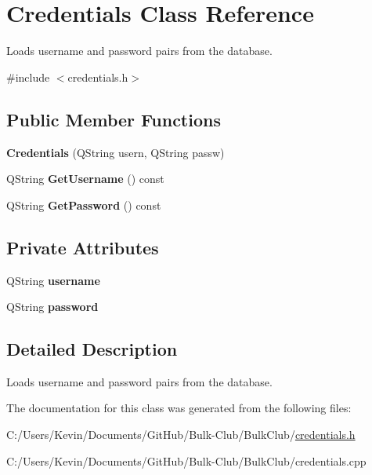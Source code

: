 \hypertarget{class_credentials}{}\section{Credentials Class Reference}
\label{class_credentials}


Loads username and password pairs from the database.  




{\ttfamily \#include $<$credentials.\+h$>$}

\subsection*{Public Member Functions}
\begin{DoxyCompactItemize}
\item 
\mbox{\label{class_credentials_a20ef865fe7e0c03ccafc644bfa7e5299}} 
{\bfseries Credentials} (Q\+String usern, Q\+String passw)
\item 
\mbox{\label{class_credentials_aef9c82c68cc3bd74ba9db91a1f21c19d}} 
Q\+String {\bfseries Get\+Username} () const
\item 
\mbox{\label{class_credentials_a5e736c8291c090474d8939f54ab34674}} 
Q\+String {\bfseries Get\+Password} () const
\end{DoxyCompactItemize}
\subsection*{Private Attributes}
\begin{DoxyCompactItemize}
\item 
\mbox{\label{class_credentials_a1e875612ba94a6853ffc948d9aa3ccfc}} 
Q\+String {\bfseries username}
\item 
\mbox{\label{class_credentials_a6d871a6473fb4101d9b60306dd56603e}} 
Q\+String {\bfseries password}
\end{DoxyCompactItemize}


\subsection{Detailed Description}
Loads username and password pairs from the database. 

The documentation for this class was generated from the following files\+:\begin{DoxyCompactItemize}
\item 
C\+:/\+Users/\+Kevin/\+Documents/\+Git\+Hub/\+Bulk-\/\+Club/\+Bulk\+Club/\mbox{\hyperlink{credentials_8h}{credentials.\+h}}\item 
C\+:/\+Users/\+Kevin/\+Documents/\+Git\+Hub/\+Bulk-\/\+Club/\+Bulk\+Club/credentials.\+cpp\end{DoxyCompactItemize}
